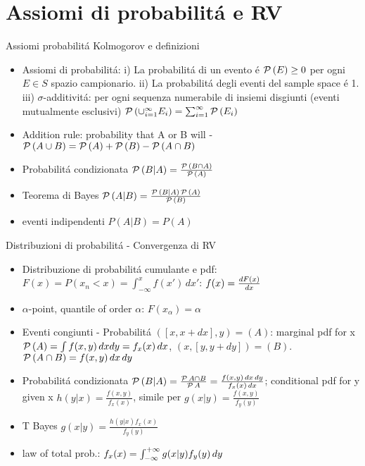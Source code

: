 \section{Assiomi di probabilit\'a e RV}

\begin{frame}{Assiomi probabilit\'a Kolmogorov e definizioni}
\begin{itemize}
	\item Assiomi di probabilit\'a: i) La probabilit\'a di un evento \'e $\prob{(E)}\geq0$ per ogni $E\in S$ spazio campionario.
	ii) La probabilit\'a degli eventi del sample space \'e 1.
	iii) $\sigma$-additivit\'a: per ogni sequenza numerabile di insiemi disgiunti (eventi mutualmente esclusivi) $\prob{(\cup_{i=1}^{\infty}E_i)}=\sum_{i=1}^{\infty}\prob{(E_i)}$
	\item Addition rule: probability that A or B will - $\prob{(A\cup B)}=\prob{(A)}+\prob{(B)}-\prob{(A\cap B)}$
	\item Probabilit\'a condizionata $\prob{(B|A)}=\frac{\prob{(B\cap A)}}{\prob{(A)}}$
	\item Teorema di Bayes $\prob{(A|B)}=\frac{\prob{(B|A)}\prob{(A)}}{\prob{(B)}}$
	\item eventi indipendenti $P(A|B)=P(A)$
\end{itemize}
\end{frame}

\begin{frame}{Distribuzioni di probabilit\'a - Convergenza di RV}
\begin{itemize}
\item Distribuzione di probabilit\'a cumulante e pdf: 	$F(x)=P(x_n<x)=\int_{-\infty}^xf(x')\,dx'$: $f(x)=\TDy{x}{F(x)}$
\item $\alpha$-point, quantile of order $\alpha$: $F(x_{\alpha})=\alpha$
\item Eventi congiunti - Probabilit\'a $([x,x+dx],y)=(A)$: marginal pdf for x $\prob{(A)}=\int f(x,y)\,dxdy=f_x(x)\,dx$, $(x,[y,y+dy])=(B)$.
$\prob{(A\cap B)}=f(x,y)\,dx\,dy$
\item Probabilit\'a condizionata $\prob{(B|A)}=\frac{\prob{A\cap B}}{\prob{A}}=\frac{f(x,y)\,dx\,dy}{f_x(x)\,dx}$; conditional pdf for y given x $h(y|x)=\frac{f(x,y)}{f_x(x)}$, simile per $g(x|y)=\frac{f(x,y)}{f_y(y)}$
\item T Bayes $g(x|y)=\frac{h(y|x)f_x(x)}{f_y(y)}$
\item law of total prob.: $f_x(x)=\intsinf{}g(x|y)f_y(y)\,dy$
\end{itemize}
\end{frame}

